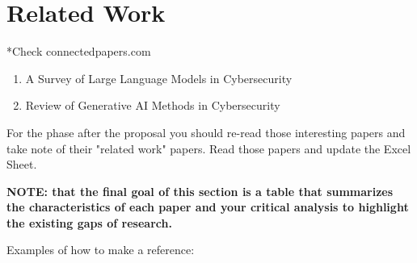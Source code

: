 \section{Related Work}
\label{sec:related-work}

*Check connectedpapers.com

\begin{enumerate}
    \item A Survey of Large Language Models in Cybersecurity
    \item Review of Generative AI Methods in Cybersecurity
\end{enumerate}

For the phase after the proposal you should re-read those interesting papers and take note of their "related work" papers. Read those papers and update the Excel Sheet.

\textbf{NOTE: that the final goal of this section is a table that summarizes the characteristics of each paper and your critical analysis to highlight the existing gaps of research.}

Examples of how to make a reference:

\citet{zhong2018learning}